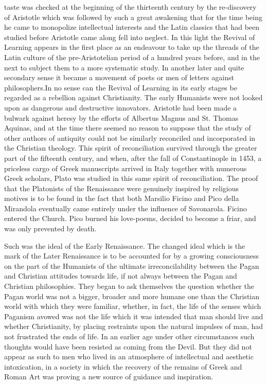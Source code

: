 \documentclass{book}
\begin{document}
taste was checked at the beginning of the thirteenth century by the re-discovery of Aristotle which was followed by such a great awakening that for the time being he came to monopolize intellectual interests and the Latin classics that had been studied before Aristotle came along fell into neglect. In this light the Revival of Learning appears in the first place as an endeavour to take up the threads of the Latin culture of the pre-Aristotelian period of a hundred years before, and in the next to subject them to a more systematic study. In another later and quite secondary sense it became a movement of poets or men of letters against philosophers.\footnotemark[2] In no sense can the Revival of Learning in its early stages be regarded as a rebellion against Christianity. The early Humanists were not looked upon as dangerous and destructive innovators. Aristotle had been made a bulwark against heresy by the efforts of Albertus Magnus and St. Thomas Aquinas, and at the time there seemed no reason to suppose that the study of other authors of antiquity could not be similarly reconciled and incorporated in the Christian theology. This spirit of reconciliation survived through the greater part of the fifteenth century, and when, after the fall of Constantinople in 1453, a priceless cargo of Greek manuscripts arrived in Italy together with numerous Greek scholars, Plato was studied in this same spirit of reconciliation. The proof that the Platonists of the Renaissance were genuinely inspired by religious motives is to be found in the fact that both Marsilio Ficino and Pico della Mirandola eventually came entirely under the influence of Savonarola. Ficino entered the Church. Pico burned his love-poems, decided to become a friar, and was only prevented by death.

Such was the ideal of the Early Renaissance. The changed ideal which is the mark of the Later Renaissance is to be accounted for by a growing consciousness on the part of the Humanists of the ultimate irreconcilability between the Pagan and Christian attitudes towards life, if not always between the Pagan and Christian philosophies. They began to ask themselves the question whether the Pagan world was not a bigger, broader and more humane one than the Christian world with which they were familiar, whether, in fact, the life of the senses which Paganism avowed was not the life which it was intended that man should live and whether Christianity, by placing restraints upon the natural impulses of man, had not frustrated the ends of life. In an earlier age under other circumstances such thoughts would have been resisted as coming from the Devil. But they did not appear as such to men who lived in an atmosphere of intellectual and aesthetic intoxication, in a society in which the recovery of the remains of Greek and Roman Art was proving a new source of guidance and inspiration.
\end{document}
